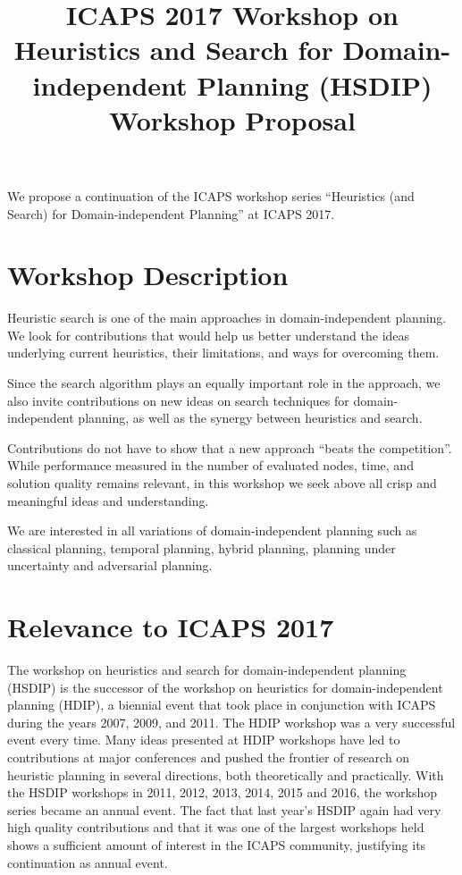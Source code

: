 \documentclass[10pt]{article}
\begin{document}
\title{ICAPS 2017 Workshop on \\ Heuristics and Search for Domain-independent
Planning (HSDIP)\\ \vspace*{0.7cm} Workshop Proposal
}
\date{}

\author{}

\maketitle


We propose a continuation of the ICAPS workshop series ``Heuristics
(and Search) for Domain-independent Planning'' at ICAPS 2017.

\section*{Workshop Description}
Heuristic search is one of the main approaches in domain-independent
planning.  We look for contributions that would help us better
understand the ideas underlying current heuristics, their limitations,
and ways for overcoming them.

Since the search algorithm plays an equally important role in the
approach, we also invite contributions on new ideas on search
techniques for domain-independent planning, as well as the synergy
between heuristics and search.

Contributions do not have to show that a new approach ``beats the competition''.
While performance measured in the number of evaluated nodes, time, and solution
quality remains relevant, in this workshop we seek above all crisp and
meaningful ideas and understanding.

We are interested in all variations of domain-independent planning
such as classical planning, temporal planning, hybrid planning, planning under
uncertainty and adversarial planning.


\section*{Relevance to ICAPS 2017}

The workshop on heuristics and search for domain-independent planning
(HSDIP) is the successor of the workshop on heuristics for
domain-independent planning (HDIP), a biennial event that took place
in conjunction with ICAPS during the years 2007, 2009, and 2011. The
HDIP workshop was a very successful event every time. Many ideas
presented at HDIP workshops have led to contributions at major
conferences and pushed the frontier of research on heuristic planning
in several directions, both theoretically and practically.
%
With the HSDIP workshops in 2011, 2012, 2013, 2014, 2015 and 2016, the workshop
series became an annual event. The fact that last year's HSDIP again had very
high quality contributions and that it was one of the largest workshops held
shows a sufficient amount of interest in the ICAPS community, justifying its
continuation as annual event.
\end{document}
